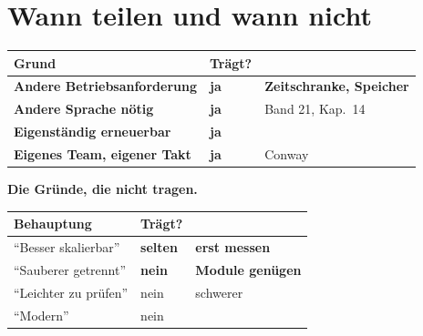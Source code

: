 \chapter{Wann teilen und wann nicht}\label{kap:teilen}

\begin{merksatz}
\begin{center}
\renewcommand{\arraystretch}{1.5}
\begin{tabular}{@{}P{3.2cm}P{2.0cm}P{2.6cm}@{}}
\toprule
\textbf{Grund} & \textbf{Trägt?} & \\
\midrule
\textbf{Andere Betriebsanforderung} & \textcolor{gruen}{\textbf{ja}} & \textbf{Zeitschranke, Speicher}\\
\textbf{Andere Sprache nötig} & \textcolor{gruen}{\textbf{ja}} & \textcolor{gruen}{Band 21, Kap.~14}\\
\textbf{Eigenständig erneuerbar} & \textcolor{gruen}{\textbf{ja}} & \\
\textbf{Eigenes Team, eigener Takt} & \textcolor{gruen}{\textbf{ja}} & \textcolor{gruen}{Conway}\\
\bottomrule
\end{tabular}
\end{center}

\begin{center}
\begin{minipage}{0.88\textwidth}
\end{minipage}
\end{center}

\textbf{Die Gründe, die nicht tragen.}

\begin{center}
{\small
\renewcommand{\arraystretch}{1.5}
\begin{tabular}{@{}P{3.2cm}P{2.0cm}P{2.6cm}@{}}
\toprule
\textbf{Behauptung} & \textbf{Trägt?} & \\
\midrule
\enquote{Besser skalierbar} & \textcolor{mittel}{\textbf{selten}} & \textbf{erst messen}\\
\enquote{Sauberer getrennt} & \textcolor{akzent}{\textbf{nein}} & \textcolor{akzent}{\textbf{Module genügen}}\\
\enquote{Leichter zu prüfen} & \textcolor{akzent}{nein} & \textcolor{akzent}{schwerer}\\
\enquote{Modern} & \textcolor{akzent}{nein} & \\
\bottomrule
\end{tabular}}
\end{center}


\end{merksatz}
